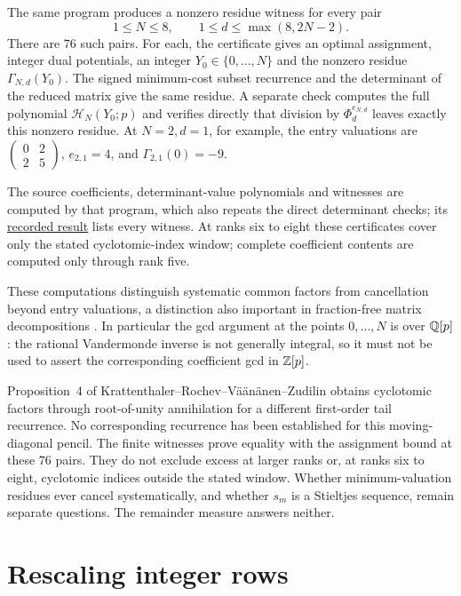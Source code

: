 \documentclass[11pt]{article}
\begin{document}
The same program produces a nonzero residue witness for every pair
\[
 1\le N\le8,\qquad 1\le d\le\max(8,2N-2).
\]
There are $76$ such pairs. For each, the certificate gives an optimal
assignment, integer dual potentials, an integer $Y_0\in\{0,\ldots,N\}$
and the nonzero residue $\Gamma_{N,d}(Y_0)$. The signed
minimum-cost subset recurrence and the determinant of the reduced
matrix give the same residue. A separate check computes the full
polynomial $\mathcal H_N(Y_0;p)$ and verifies directly that division
by $\Phi_d^{e_{N,d}}$ leaves exactly this nonzero residue.
At $N=2,d=1$, for example, the entry valuations are
$\left(\begin{smallmatrix}0&2\\2&5\end{smallmatrix}\right)$,
$e_{2,1}=4$, and $\Gamma_{2,1}(0)=-9$.

The source coefficients, determinant-value polynomials and witnesses
are computed by that program, which also repeats the direct
determinant checks; its \href{https://github.com/wcook04/plectis-erdos/blob/4beca4ad0c00a626def9c73f2420e20ebf8d1968/research/experiments/erdos1049/receipts/cyclotomic-content.json}{recorded result} lists every witness. At ranks six to eight
these certificates cover only the stated cyclotomic-index window;
complete coefficient contents are computed only through rank five.

These computations distinguish systematic common factors from
cancellation beyond entry valuations, a distinction also important in
fraction-free matrix decompositions \cite[Sec.~2; Thm.~6]{middeke2021}.
In particular the gcd argument at the points $0,\ldots,N$ is over
$\mathbb{Q}[p]$: the rational Vandermonde inverse is not generally integral, so
it must not be used to assert the corresponding coefficient gcd in $\mathbb{Z}[p]$.


Proposition~4 of Krattenthaler--Rochev--V\"a\"an\"anen--Zudilin
\cite[pp.~14--15; (4.10), p.~17]{krvz2009} obtains cyclotomic factors
through root-of-unity annihilation for a different first-order tail
recurrence. No corresponding recurrence has been established for this
moving-diagonal pencil. The finite witnesses prove equality with the assignment bound at
these $76$ pairs. They do not exclude excess at larger ranks or, at
ranks six to eight, cyclotomic indices outside the stated window. Whether minimum-valuation residues ever cancel
systematically, and whether $s_m$ is a Stieltjes sequence, remain separate
questions. The remainder measure answers neither.

\section{Rescaling integer rows}\label{long1049:sec:primitive}
\end{document}
